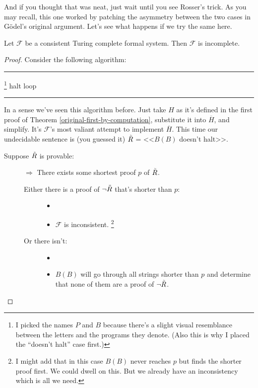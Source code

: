 \documentclass{article}
\theoremstyle{customstyle}
\newcommand{\F}{\ensuremath{\mathcal{F}}}
\newcommand{\iRosser}{\ensuremath{\accentset{\scalebox{0.35}{$\infty$}}{R}}}
\newenvironment{algo}{\begin{samepage}\medskip\hrule\begin{algorithmic}}{\end{algorithmic}\hrule\medskip\end{samepage}}
\begin{document}
And if you thought that was neat, just wait until you see Rosser's trick. As you may recall, this one worked by patching the asymmetry between the two cases in Gödel's original argument. Let's see what happens if we try the same here.

\begin{theorem}
Let $\F$ be a consistent Turing complete formal system. Then $\F$ is incomplete.
\end{theorem}

\begin{proof}\vspace{-\topsep}
Consider the following algorithm:
\begin{algo}
\footnote{I picked the names $P$ and $B$ because there's a slight visual resemblance between the letters and the programs they denote. (Also this is why I placed the ``doesn't halt'' case first.)}
      \State halt
    \EndIf
      \State loop
    \EndIf
  \EndFor
\EndFunction
\end{algo}
In a sense we've seen this algorithm before. Just take $H$ as it's defined in the first proof of Theorem \ref{original-first-by-computation}, substitute it into $\overline{H}$, and simplify. It's $\F$'s most valiant attempt to implement $\overline{H}$. This time our undecidable sentence is (you guessed it) $\iRosser$ = <<$B(B)$ doesn't halt>>.
\begin{description}
\item[Suppose $\iRosser$ is provable:]
$\Rightarrow$ There exists some shortest proof $p$ of $\iRosser$.
\begin{description}
\item[Either there is a proof of $\neg \iRosser$ that's shorter than $p$:]
\begin{itemize}
\item[]
\item $\F$ is inconsistent. \lightning\footnote{I might add that in this case $B(B)$ never reaches $p$ but finds the shorter proof first. We could dwell on this. But we already have an inconsistency which is all we need.}
\end{itemize}
\item[Or there isn't:]
\begin{itemize}
\item[]
\item $B(B)$ will go through all strings shorter than $p$ and determine that none of them are a proof of $\neg \iRosser$.

\end{itemize}
\end{description}
\end{description}
\end{proof}
\end{document}
